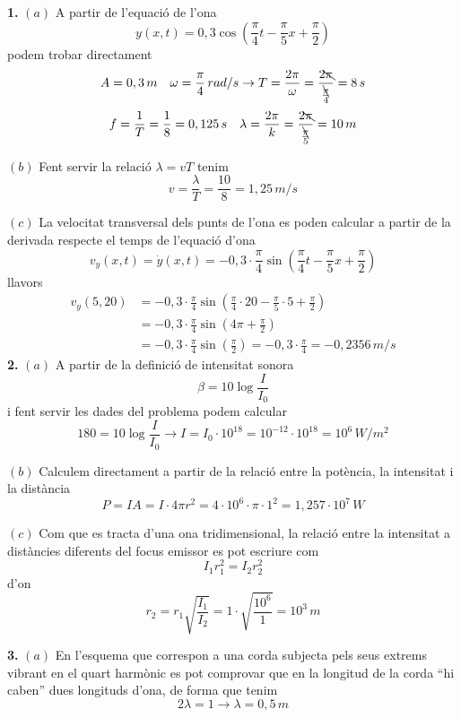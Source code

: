 \documentclass[a4paper,12pt]{article}
\begin{document}
\noindent\textbf{1.} $(a)$
A partir de l'equació de l'ona
$$y(x,t)=0,3\cos\left(\frac{\pi}{4}t-\frac{\pi}{5}x+\frac{\pi}{2} \right)$$
podem trobar directament
$$A=0,3\,m\quad \omega=\frac{\pi}{4}\,rad/s\rightarrow T=\frac{2\pi}{\omega}=\frac{2\bcancel{\pi}}{\frac{\bcancel{\pi}}{4}}=8\,s$$
$$f=\frac{1}{T}=\frac{1}{8}=0,125\,s\quad \lambda=\frac{2\pi}{k}=\frac{2\bcancel{\pi}}{\frac{\bcancel{\pi}}{5}}=10\,m$$

\bigskip
\noindent$(b)$ 
Fent servir la relació $\lambda=vT$ tenim
$$v=\frac{\lambda}{T}=\frac{10}{8}=1,25\,m/s$$

\bigskip
\noindent$(c)$
La velocitat transversal dels punts de l'ona es poden calcular a partir de la derivada respecte el temps de l'equació d'ona
$$v_{y}(x,t)=\dot{y}(x,t)=-0,3\cdot\frac{\pi}{4}\sin\left(\frac{\pi}{4}t-\frac{\pi}{5}x+\frac{\pi}{2}\right)$$
llavors
\begin{equation*}
\begin{split}
v_{y}(5,20)&=-0,3\cdot\frac{\pi}{4} 
 \sin\left(\frac{\pi}{4}\cdot20-\frac{\pi}{5}\cdot 5+\frac{\pi}{2}\right)\\
 &=-0,3\cdot\frac{\pi}{4}\sin\left(4\pi+\frac{\pi}{2}\right)\\
 &=-0,3\cdot\frac{\pi}{4}\sin\left(\frac{\pi}{2}\right)=-0,3\cdot\frac{\pi}{4}=-0,2356\,m/s
\end{split}
\end{equation*}
\textbf{2.} $(a)$ A partir de la definició de intensitat sonora
$$\beta=10\log\frac{I}{I_{0}}$$
i fent servir les dades del problema podem calcular
$$180=10\log\frac{I}{I_{0}}\rightarrow I=I_{0}\cdot10^{18}=10^{-12}\cdot10^{18}=10^{6}\,W/m^{2}$$
\bigskip

\noindent$(b)$ Calculem directament a partir de la relació entre la potència, la intensitat i la distància
$$P=IA=I\cdot4\pi r^{2}=4\cdot10^{6}\cdot\pi\cdot1^{2}=1,257\cdot10^{7 }\,W$$

\bigskip

\noindent$(c)$ Com que es tracta d'una ona tridimensional, la relació entre la intensitat a distàncies diferents del focus emissor es pot escriure com
$$I_{1}r^{2}_{1}=I_{2}r^{2}_{2}$$
d'on
$$r_{2}=r_{1}\sqrt{\frac{I_{1}}{I_{2}}}=1\cdot\sqrt{\frac{10^{6}}{1}}=10^{3}\,m$$
\bigskip

\noindent\textbf{3.} 
\noindent $(a)$ En l'esquema que correspon a una corda subjecta pels seus extrems vibrant en el quart harmònic es pot comprovar que en la longitud de la corda ``hi caben'' dues longituds d'ona, de forma que tenim
$$2 \lambda=1\rightarrow \lambda=0,5\,m$$
\bigskip
\end{document}

